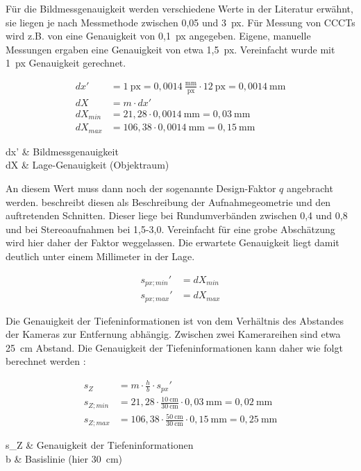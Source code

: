\documentclass[./00PhotoBox.tex]{subfiles}
\begin{document}
Für die Bildmessgenauigkeit werden verschiedene Werte in der Literatur erwähnt, sie liegen je nach Messmethode zwischen 0,05 und 3~px. Für Messung von CCCTs wird z.B. von \cite{soot2015} eine Genauigkeit von 0,1~px angegeben.
Eigene, manuelle Messungen ergaben eine Genauigkeit von etwa 1,5~px. Vereinfacht wurde mit 1~px Genauigkeit gerechnet.

\begin{align}
    dx'      & = 1~\text{px} = 0,0014~\frac{\text{mm}}{\text{px}} \cdot 12~\text{px} = 0,0014~\text{mm} \\
    dX       & = m \cdot dx'                                                                            \\
    dX_{min} & = 21,28 \cdot 0,0014~\text{mm} = 0,03~\text{mm}                                          \\
    dX_{max} & = 106,38 \cdot 0,0014~\text{mm} = 0,15~\text{mm}
\end{align}
\begin{conditions}
    dx' & Bildmessgenauigkeit \\
    dX  & Lage-Genauigkeit (Objektraum)
\end{conditions}

An diesem Wert muss dann noch der sogenannte Design-Faktor $q$ angebracht werden. \cite[S. 174]{luhmann} beschreibt diesen als Beschreibung der Aufnahmegeometrie und den auftretenden Schnitten. Dieser liege bei Rundumverbänden zwischen 0,4 und 0,8 und bei Stereoaufnahmen bei 1,5-3,0. Vereinfacht für eine grobe Abschätzung wird hier daher der Faktor weggelassen. Die erwartete Genauigkeit liegt damit deutlich unter einem Millimeter in der Lage.

\begin{align}
    s_{px; min}' & = dX_{min} \\
    s_{px; max}' & = dX_{max}
\end{align}

Die Genauigkeit der Tiefeninformationen ist von dem Verhältnis des Abstandes der Kameras zur Entfernung abhängig. Zwischen zwei Kamerareihen sind etwa 25~cm Abstand. Die Genauigkeit der Tiefeninformationen kann daher wie folgt berechnet werden \citep[S. 174]{luhmann}:

\begin{align}
    s_Z       & = m \cdot \frac{h}{b} \cdot s_{px}'                                                    \\
    s_{Z;min} & = 21,28 \cdot \frac{10~\text{cm}}{30~\text{cm}}\cdot 0,03~\text{mm}  = 0,02~\text{mm}  \\
    s_{Z;max} & = 106,38 \cdot \frac{50~\text{cm}}{30~\text{cm}} \cdot 0,15~\text{mm} = 0,25~\text{mm}
\end{align}
\begin{conditions}
    s_Z & Genauigkeit der Tiefeninformationen \\
    b   & Basislinie (hier 30~cm)
\end{conditions}
\end{document}
